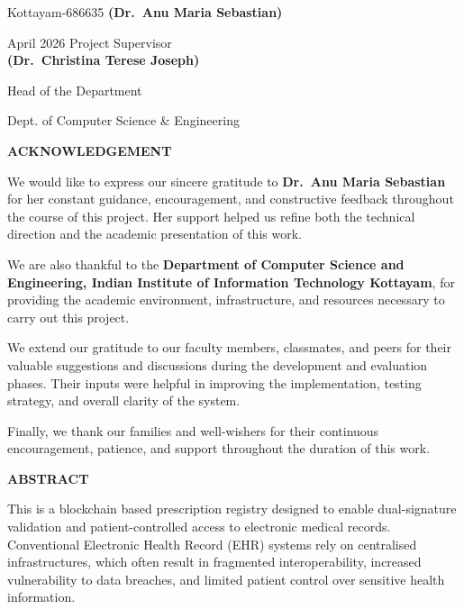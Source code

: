 \documentclass[12pt,a4wide]{report}
\begin{document}
\vspace{4cm}

\noindent Kottayam-686635 \hfill \textbf{(Dr.\ Anu Maria Sebastian)}

\noindent April 2026 \hfill Project Supervisor\\

\vspace{2.5cm}
\noindent\hfill\hfill \textbf{(Dr.\ Christina Terese Joseph)}

\noindent \hfill Head of the Department

\noindent\hfill\hfill Dept. of Computer Science \& Engineering\\

\clearpage

\begin{center}
{\Large{\bf{ACKNOWLEDGEMENT}}}
\end{center}

We would like to express our sincere gratitude to \textbf{Dr.\ Anu Maria Sebastian}
for her constant guidance, encouragement, and constructive feedback throughout the
course of this project. Her support helped us refine both the technical direction
and the academic presentation of this work.

We are also thankful to the \textbf{Department of Computer Science and Engineering,
Indian Institute of Information Technology Kottayam}, for providing the academic
environment, infrastructure, and resources necessary to carry out this project.

We extend our gratitude to our faculty members, classmates, and peers for their
valuable suggestions and discussions during the development and evaluation phases.
Their inputs were helpful in improving the implementation, testing strategy, and
overall clarity of the system.

Finally, we thank our families and well-wishers for their continuous encouragement,
patience, and support throughout the duration of this work.

\clearpage

\begin{center}
{\Large{\bf{ABSTRACT}}}
\end{center}

This is a blockchain based prescription registry designed to enable dual-signature validation and patient-controlled access to electronic medical records. Conventional Electronic Health Record (EHR) systems rely on centralised infrastructures, which often result in fragmented interoperability, increased vulnerability to data breaches, and limited patient control over sensitive health information.
\end{document}
